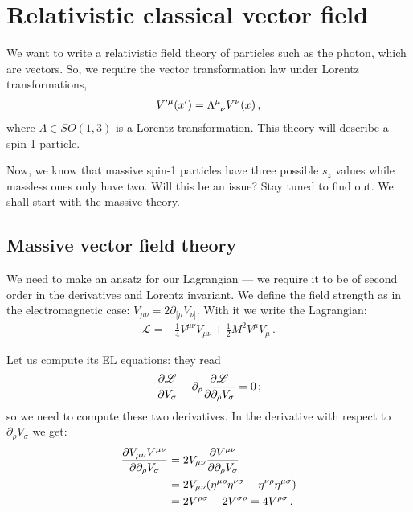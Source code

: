 \documentclass[main.tex]{subfiles}
\begin{document}
\section{Relativistic classical vector field}


We want to write a relativistic field theory of particles such as the photon, which are vectors.
So, we require the vector transformation law under Lorentz transformations, 
%
\begin{align}
V^{\prime \mu } (x') = \tensor{\Lambda }{^{\mu }_{\nu }} V^{\nu } (x)
\,,
\end{align}
%
where \(\Lambda \in SO(1, 3)\) is a Lorentz transformation.
This theory will describe a spin-1 particle. 

Now, we know that massive spin-1 particles have three possible \(s_z\) values while massless ones only have two. Will this be an issue? Stay tuned to find out. We shall start with the massive theory. 

\subsection{Massive vector field theory}

We need to make an ansatz for our Lagrangian --- we require it to be of second order in the derivatives and Lorentz invariant. We define the field strength as in the electromagnetic case: \(V_{\mu \nu } = 2 \partial_{[\mu} V_{\nu ]}\). With it we write the Lagrangian:
%
\begin{align}
\mathscr{L} = - \frac{1}{4}  V^{\mu \nu } V_{\mu \nu } + \frac{1}{2} M^2 V^{\mu }V_{\mu }
\,.
\end{align}

Let us compute its EL equations: they read 
%
\begin{align}
\pdv{\mathscr{L}}{V_{\sigma }} - \partial_{\rho } \pdv{\mathscr{L}}{\partial_{ \rho } V_{\sigma }} = 0
\,;
\end{align}
%
so we need to compute these two derivatives. In the derivative with respect to \(\partial_{\rho } V_{\sigma }\) we get: 
%
\begin{align}
\pdv{V_{\mu \nu } V^{\mu \nu }}{\partial_{\rho }V_{\sigma }}
&= 2 V_{\mu \nu } \pdv{V^{\mu \nu }}{\partial_{\rho }V_{\sigma }}  \\
&= 2 V_{\mu \nu }\qty(\eta^{\mu \rho } \eta^{\nu \sigma } - \eta^{\nu \rho } \eta^{\mu \sigma })  \\
&= 2 V^{\rho \sigma } - 2 V^{\sigma \rho } = 4 V^{\rho \sigma }
\,.
\end{align}
\end{document}
